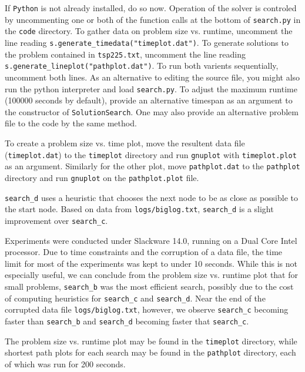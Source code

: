 \documentclass{article}
\begin{document}


If {\tt Python} is not already installed, do so now. Operation of the solver is controled by uncommenting one or both of the function calls at the bottom of {\tt search.py} in the {\tt code} directory. To gather data on problem size vs. runtime, uncomment the line reading {\tt s.generate_timedata("timeplot.dat")}. To generate solutions to the problem contained in {\tt tsp225.txt}, uncomment the line reading {\tt s.generate_lineplot("pathplot.dat")}. To run both varients sequentially, uncomment both lines. As an alternative to editing the source file, you might also run the python interpreter and load {\tt search.py}. To adjust the maximum runtime (100000 seconds by default), provide an alternative timespan as an argument to the constructor of {\tt SolutionSearch}. One may also provide an alternative problem file to the code by the same method.

To create a problem size vs. time plot, move the resultent data file ({\tt timeplot.dat}) to the {\tt timeplot} directory and run {\tt gnuplot} with {\tt timeplot.plot} as an argument. Similarly for the other plot, move {\tt pathplot.dat} to the {\tt pathplot} directory and run {\tt gnuplot} on the {\tt pathplot.plot} file.


{\tt search_d} uses a heuristic that chooses the next node to be as close as possible to the start node. Based on data from {\tt logs/biglog.txt}, {\tt search_d} is a slight improvement over {\tt search_c}.


Experiments were conducted under Slackware 14.0, running on a Dual Core Intel processor. Due to time constraints and the corruption of a data file, the time limit for most of the experiments was kept to under 10 seconds. While this is not especially useful, we can conclude from the problem size vs. runtime plot that for small problems, {\tt search_b} was the most efficient search, possibly due to the cost of computing heuristics for {\tt search_c} and {\tt search_d}. Near the end of the corrupted data file {\tt logs/biglog.txt}, however, we observe {\tt search_c} becoming faster than {\tt search_b} and {\tt search_d} becoming faster that {\tt search_c}.

The problem size vs. runtime plot may be found in the {\tt timeplot} directory, while shortest path plots for each search may be found in the {\tt pathplot} directory, each of which was run for 200 seconds.
\end{document}
